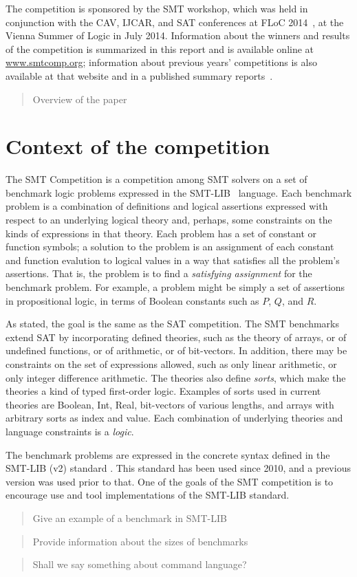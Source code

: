 \documentclass[twosize,11pt]{article}
\newcommand{\comment}[2]{\begin{quote}\sc #1\marginpar{\textcolor{red}{$\ast^{\mbox{#2}}$}}\end{quote}}
\newcommand{\tjark}[1]{\comment{#1}{TW}}
\newcommand{\davidd}[1]{\comment{#1}{DD}}
\begin{document}
The competition is sponsored by the SMT workshop, which was held in conjunction with the
CAV, IJCAR, and SAT conferences at FLoC 2014~\cite{FLoC2014}, at the Vienna Summer of Logic\cite{VSL} in July 2014.
Information about the winners
and results of the competition is summarized in this report and is available online at \url{www.smtcomp.org}; information
about previous years' competitions is also available at that website and in a published summary reports~\cite{springerlink:10.1007/s10817-012-9246-5,DBLP:conf/cade/CokGBD12,it:2014-017}.%

\davidd{Overview of the paper}

\section{Context of the competition}
\label{sec:context}

The SMT Competition is a competition among SMT solvers on a set of benchmark logic problems expressed in the SMT-LIB~\cite{BarST-RR-10} language. Each benchmark problem is a combination of definitions and logical assertions expressed with respect to an underlying logical theory and, perhaps, some constraints on the kinds of expressions in that theory. Each problem has a set of constant or function symbols; a solution to the problem is an assignment of each constant and function evalution to logical values in a way that satisfies all the problem's assertions. That is, the problem is to find a \textit{satisfying assignment} for the benchmark problem. For example, a problem might be simply a set of assertions in 
propositional logic, in terms of Boolean constants such as $P$, $Q$, and $R$.

As stated, the goal is the same as the SAT competition. The SMT benchmarks extend SAT by incorporating defined theories, such as the theory of arrays, or of undefined functions, or of arithmetic, or of bit-vectors. In addition, there may be constraints on the set of expressions allowed, such as only linear arithmetic, or only integer difference arithmetic. The theories also define \textit{sorts}, which make the theories a kind of typed first-order logic. Examples of sorts used in current theories are Boolean, Int, Real, bit-vectors of various lengths, and arrays with arbitrary sorts as index and value. Each combination of underlying theories and language constraints is a \textit{logic}.

The benchmark problems are expressed in the concrete syntax defined in the SMT-LIB (v2) standard \cite{BarST-RR-10}. This standard has been used since 2010, and a previous version was used prior to that. One of the goals of the SMT competition is to encourage use and tool implementations of the SMT-LIB standard.
\tjark{Give an example of a benchmark in SMT-LIB} \tjark{Provide information about the sizes of benchmarks}
\davidd{Shall we say something about command language?}
\end{document}
